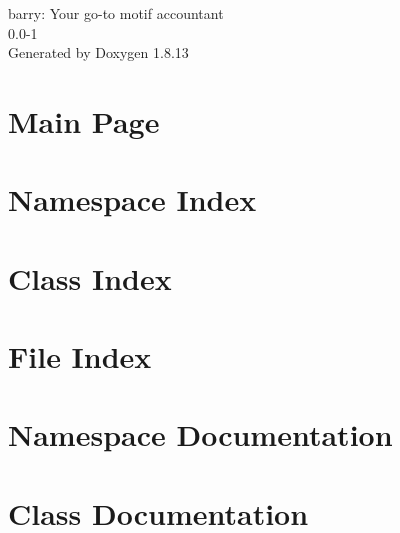 \documentclass[twoside]{book}
\newcommand{\+}{\discretionary{\mbox{\scriptsize$\hookleftarrow$}}{}{}}
\newcommand{\clearemptydoublepage}{%
  \newpage{\pagestyle{empty}\cleardoublepage}%
}
\begin{document}
\hypersetup{pageanchor=false,
             bookmarksnumbered=true,
             pdfencoding=unicode
            }
\begin{titlepage}
\vspace*{7cm}
\begin{center}%
{\Large barry\+: Your go-\/to motif accountant \\[1ex]\large 0.\+0-\/1 }\\
\vspace*{1cm}
{\large Generated by Doxygen 1.8.13}\\
\end{center}
\end{titlepage}
\clearemptydoublepage
{}
\tableofcontents
\clearemptydoublepage
{}
\hypersetup{pageanchor=true}

\chapter{Main Page}
\label{index}\hypertarget{index}{}
\chapter{Namespace Index}

\chapter{Class Index}

\chapter{File Index}

\chapter{Namespace Documentation}








\chapter{Class Documentation}




























\end{document}
